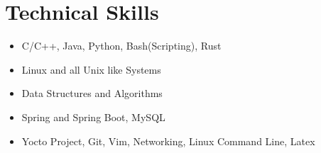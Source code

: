 \documentclass[10pt,a5paper]{article}
\begin{document}
\section{Technical Skills}
\begin{itemize}[leftmargin=3mm]
\item{C/C++, Java, Python, Bash(Scripting), Rust}
\item{Linux and all Unix like Systems}
\item{Data Structures and Algorithms}
\item{Spring and Spring Boot, MySQL}
\item{Yocto Project, Git, Vim, Networking, Linux Command Line, Latex}
\end{itemize}
\end{document}

